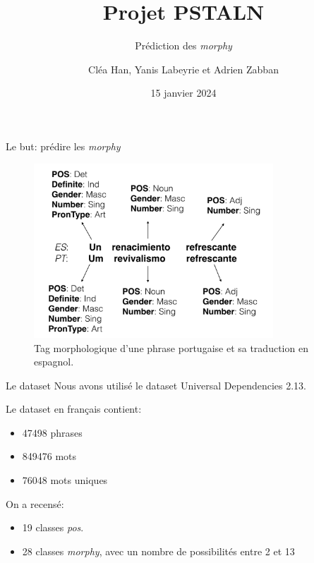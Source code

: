 \documentclass[11pt]{beamer}
\title{Projet PSTALN}
\subtitle{Prédiction des \textit{morphy}}
\author{Cléa Han, Yanis Labeyrie et Adrien Zabban}
\date{15 janvier 2024}
\begin{document}
\maketitle

\begin{frame}{Le but: prédire les \textit{morphy}}
    \begin{figure}[b]
        \centering
        \includegraphics[width=0.8\textwidth]{morphy.png}
        \caption{Tag morphologique d'une phrase portugaise et sa traduction en espagnol.}
    \end{figure}
\end{frame}

\begin{frame}{Le dataset}
    Nous avons utilisé le dataset Universal Dependencies 2.13.

    Le dataset en français contient:
    \begin{itemize}
        \item 47498 phrases
        \item 849476 mots
        \item 76048 mots uniques
    \end{itemize}

    On a recensé:
    \begin{itemize}
        \item 19 classes \textit{pos}.
        \item 28 classes \textit{morphy}, avec un nombre de possibilités entre 2 et 13
    \end{itemize}
\end{frame}
\end{document}
